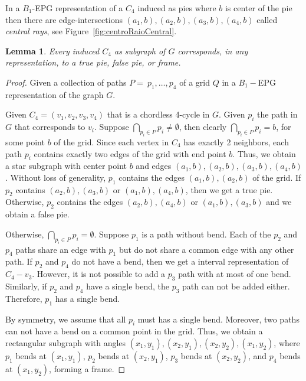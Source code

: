 \documentclass[a4paper,11pt]{article}
\newtheorem{lema}[theorem]{Lemma}
\begin{document}


In a $B_1$-EPG representation of a $C_4$ induced as pies where $b$ is center of the pie then there are edge-intersections $ (a_1, b), (a_2, b), (a_3, b), (a_4, b)$ called \emph{central rays}, see Figure~\ref{fig:centroRaioCentral}.




\begin{lema}\label{lem:representacaoC4}
\citep{golumbic2009} Every induced $C_4$  as subgraph of $ G $ corresponds, in any representation, to a true pie, false pie, or frame.
\end{lema}
\begin{proof} Given a collection of paths $ P = \ {p_1, \dots, p_4}$ of a grid $ Q $ in a $ B_1-$EPG representation of the graph $G$.

Given $ C_4 = (v_1, v_2, v_3, v_4) $ that is a chordless 4-cycle in $ G$. Given $p_i$ the path in $ G $ that corresponds to $v_i $.
Suppose $ \displaystyle \bigcap _{p_i \in P} p_i \neq \emptyset $, then clearly $ \displaystyle \bigcap _{p_i \in P} p_i = {b} $, for some point $ b $ of the grid. Since each vertex in $ C_4 $ has exactly 2 neighbors, each path $ p_i $ contains exactly two edges of the grid with end point $ b$. Thus, we obtain a star subgraph with center point $ b $ and edges $ (a_1, b), (a_2, b), (a_3, b), (a_4, b)$.
Without loss of generality, $ p_1 $ contains the edges $ (a_1, b), (a_2, b) $ of the grid. If $ p_2 $ contains $ (a_2, b), (a_3, b) $ or $ (a_1, b), (a_4, b) $, then we get a true pie. Otherwise, $ p_2 $ contains the edges $ (a_2, b), (a_4, b) $ or $ (a_1, b), (a_3, b) $ and we obtain a false pie.

Otherwise, $ \displaystyle \bigcap_ {p_i \in P} p_i = \emptyset$. Suppose $ p_1 $ is a path without bend. Each of the $ p_2 $ and $ p_4 $ paths share an edge with $ p_1 $ but do not share a common edge with any other path. If $ p_2 $ and $ p_4 $ do not have a bend, then we get a interval representation of $ C_4 - v_3 $. However, it is not possible to add a $ p_3 $ path with at most of one bend. Similarly, if $ p_2 $ and $ p_4 $ have a single bend, the $ p_3 $ path can not be added either. Therefore, $ p_1 $ has a single bend.

By symmetry, we assume that all $ p_i $ must has a single bend. Moreover, two paths can not have a bend on a common point in the grid. Thus, we obtain a rectangular subgraph with angles $ (x_1, y_1), (x_2, y_1), (x_2, y_2), (x_1, y_2) $, where $ p_1 $ bends at $ (x_1, y_1) $, $ p_2 $ bends at $ (x_2, y_1) $, $ p_3 $ bends at $ (x_2, y_2) $, and $ p_4 $ bends at $ (x_1, y_2) $, forming a frame.
\end{proof}
\end{document}
